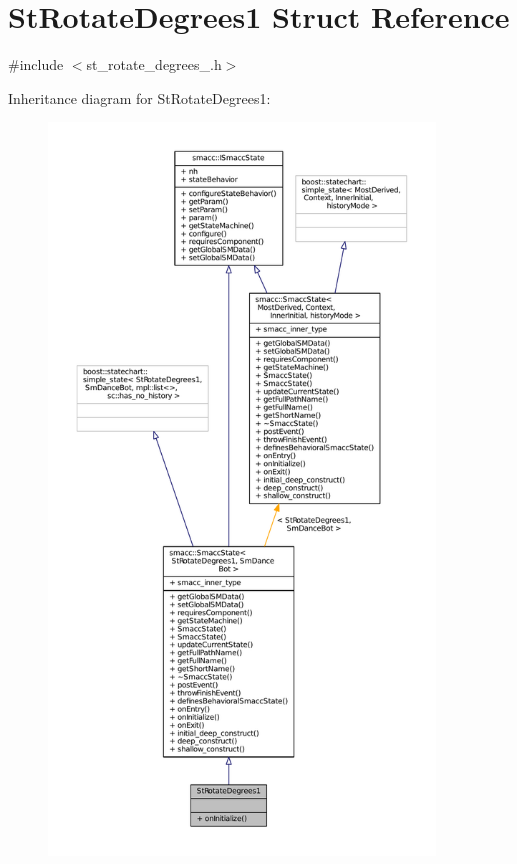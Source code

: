 \hypertarget{structStRotateDegrees1}{}\section{St\+Rotate\+Degrees1 Struct Reference}
\label{structStRotateDegrees1}


{\ttfamily \#include $<$st\+\_\+rotate\+\_\+degrees\+\_.\+h$>$}



Inheritance diagram for St\+Rotate\+Degrees1\+:
\nopagebreak
\begin{figure}[H]
\begin{center}
\leavevmode
\includegraphics[height=550pt]{structStRotateDegrees1__inherit__graph}
\end{center}
\end{figure}


